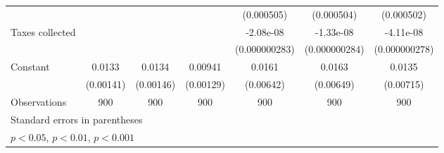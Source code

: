 {\begin{tabular}{l*{6}{c}}
                    &                     &                     &                     &  (0.000505)         &  (0.000504)         &  (0.000502)         \\
[1em]
Taxes collected     &                     &                     &                     &   -2.08e-08         &   -1.33e-08         &   -4.11e-08         \\
                    &                     &                     &                     &(0.000000283)         &(0.000000284)         &(0.000000278)         \\
[1em]
Constant            &      0.0133\sym{***}&      0.0134\sym{***}&     0.00941\sym{***}&      0.0161\sym{*}  &      0.0163\sym{*}  &      0.0135         \\
                    &   (0.00141)         &   (0.00146)         &   (0.00129)         &   (0.00642)         &   (0.00649)         &   (0.00715)         \\
\hline
Observations        &         900         &         900         &         900         &         900         &         900         &         900         \\
\hline\hline
\multicolumn{7}{l}{\footnotesize Standard errors in parentheses}\\
\multicolumn{7}{l}{\footnotesize \sym{*} \(p<0.05\), \sym{**} \(p<0.01\), \sym{***} \(p<0.001\)}\\
\end{tabular}
}
